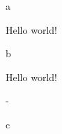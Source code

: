 \documentclass{article}
\begin{document}
  a
  \begin{texvoiceListing}
   Hello world!
   \begin{tasks}
    \description
   \end{tasks}
   \begin{expenses}
   \description
   \end{expenses}
  \end{texvoiceListing}
  b
  \begin{texvoiceListing}
   Hello world!
   \begin{travel}
    \from - \to
   \end{travel}
  \end{texvoiceListing}
  c
\end{document}

